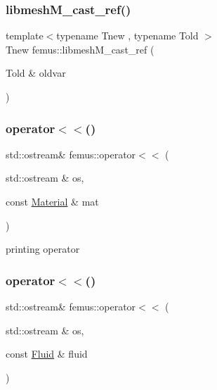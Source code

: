 \mbox{\label{namespacefemus_a2a4532ef8c12e9870ad10eb2c4a14efa}} 
\subsubsection{\texorpdfstring{libmesh\+M\+\_\+cast\+\_\+ref()}{libmeshM\_cast\_ref()}}
{\footnotesize\ttfamily template$<$typename Tnew , typename Told $>$ \\
Tnew femus\+::libmesh\+M\+\_\+cast\+\_\+ref (\begin{DoxyParamCaption}\item[{Told \&}]{oldvar }\end{DoxyParamCaption})\hspace{0.3cm}{\ttfamily [inline]}}

\mbox{\label{namespacefemus_ac61df46f1e6dacd6962ad16d94f82c2c}} 
\subsubsection{\texorpdfstring{operator$<$$<$()}{operator<<()}\hspace{0.1cm}{\footnotesize\ttfamily [1/5]}}
{\footnotesize\ttfamily std\+::ostream\& femus\+::operator$<$$<$ (\begin{DoxyParamCaption}\item[{std\+::ostream \&}]{os,  }\item[{const \mbox{\hyperlink{classfemus_1_1_material}{Material}} \&}]{mat }\end{DoxyParamCaption})}

printing operator \mbox{\label{namespacefemus_a37bc14941651d527a0137bd766fb1713}} 
\subsubsection{\texorpdfstring{operator$<$$<$()}{operator<<()}\hspace{0.1cm}{\footnotesize\ttfamily [2/5]}}
{\footnotesize\ttfamily std\+::ostream\& femus\+::operator$<$$<$ (\begin{DoxyParamCaption}\item[{std\+::ostream \&}]{os,  }\item[{const \mbox{\hyperlink{classfemus_1_1_fluid}{Fluid}} \&}]{fluid }\end{DoxyParamCaption})}

